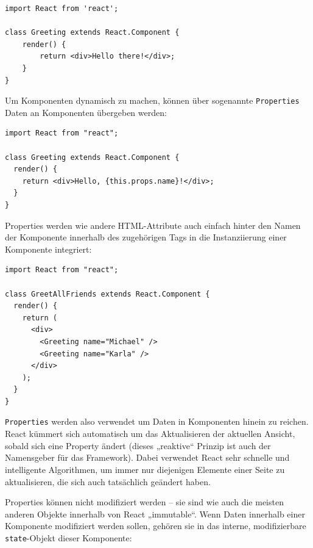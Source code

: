\begin{minipage}{\linewidth}
\begin{lstlisting}[caption={Einfache React-Komponente mit JSX-Syntax.}]
import React from 'react';

class Greeting extends React.Component {
    render() {
        return <div>Hello there!</div>;
    }
}
\end{lstlisting}
\end{minipage}

Um Komponenten dynamisch zu machen, können über sogenannte \texttt{Properties} Daten an Komponenten übergeben werden:

\begin{minipage}{\linewidth}
\begin{lstlisting}[caption={Komponenten erhalten Daten über ihre Properties.}]
import React from "react";

class Greeting extends React.Component {
  render() {
    return <div>Hello, {this.props.name}!</div>;
  }
}
\end{lstlisting}
\end{minipage}

Properties werden wie andere HTML-Attribute auch einfach hinter den Namen der Komponente innerhalb des zugehörigen Tags in die Instanziierung einer Komponente integriert:

\begin{minipage}{\linewidth}
\begin{lstlisting}[caption={Properties werden wie normale HTML-Attribute verwendet.}]
import React from "react";

class GreetAllFriends extends React.Component {
  render() {
    return (
      <div>
        <Greeting name="Michael" />
        <Greeting name="Karla" />
      </div>
    );
  }
}
\end{lstlisting}
\end{minipage}

\texttt{Properties} werden also verwendet um Daten in Komponenten hinein zu reichen. React kümmert sich automatisch um das Aktualisieren der aktuellen Ansicht, sobald sich eine Property ändert (dieses „reaktive“ Prinzip ist auch der Namensgeber für das Framework). Dabei verwendet React sehr schnelle und intelligente Algorithmen, um immer nur diejenigen Elemente einer Seite zu aktualisieren, die sich auch tatsächlich geändert haben.

Properties können nicht modifiziert werden – sie sind wie auch die meisten anderen Objekte innerhalb von React „immutable“. Wenn Daten innerhalb einer Komponente modifiziert werden sollen, gehören sie in das interne, modifizierbare \texttt{state}-Objekt dieser Komponente:

